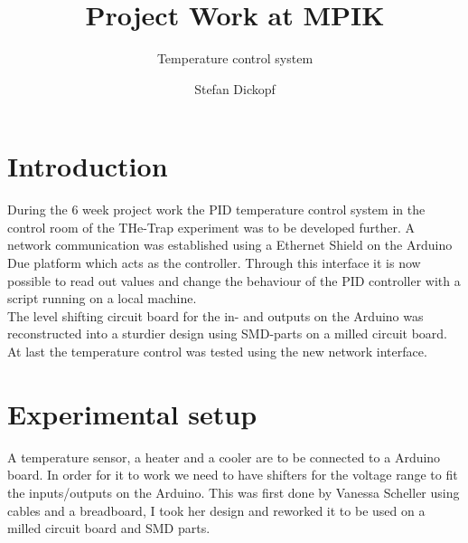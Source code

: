 \documentclass[12pt]{scrartcl}
\begin{document}
  \title{Project Work at MPIK}
  \subtitle{Temperature control system}
  \date{}
  \author{Stefan Dickopf}
  \maketitle

  \section{Introduction}
    During the 6 week project work the PID temperature control system in the
    control room of the THe-Trap experiment was to be developed further. A
    network communication was established using a Ethernet Shield on
    the Arduino Due platform which acts as the controller. Through this
    interface it is now possible to read out values and change the behaviour
    of the PID controller with a script running on a local machine.\\
    The level shifting circuit board for the in- and outputs on the Arduino
    was reconstructed into a sturdier design using SMD-parts on a milled
    circuit board.\\
    At last the temperature control was tested using the new network interface.

  \section{Experimental setup}
    A temperature sensor, a heater and a cooler are to be connected to a Arduino
    board. In order for it to work we need to have shifters for the voltage
    range to fit the inputs/outputs on the Arduino. This was first done by
    Vanessa Scheller using cables and a breadboard, I took her design and
    reworked it to be used on a milled circuit board and SMD parts.
\end{document}
